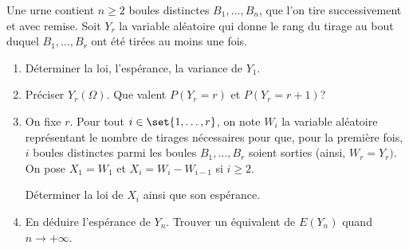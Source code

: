 \begin{enonce}
\begin{exercise}[ID={RMS127 E763},subtitle={Mines-Ponts PSI 2016},tags={}, difficulty={0}]
  Une urne contient $n\geq2$ boules distinctes $B_1,\dots,B_n$, que l'on tire successivement et avec remise.
  Soit $Y_r$ la variable aléatoire qui donne le rang du tirage au bout duquel $B_1,\dots,B_r$ ont été tirées au moins une fois.
  \begin{enumerate}
    \item Déterminer la loi, l'espérance, la variance de $Y_1$.

    \item Préciser $Y_r(\Omega)$.
      Que valent $P\left( Y_r = r \right)$ et $P\left( Y_r = r+1 \right)$?

    \item On fixe $r$.
      Pour tout $i\in\set{1,\dots,r}$, on note $W_i$ la variable aléatoire représentant le nombre de tirages nécessaires pour que, pour la première fois, $i$ boules distinctes parmi les boules $B_1,\dots,B_r$ soient sorties (ainsi, $W_r=Y_r)$.
      On pose $X_1=W_1$ et $X_i=W_i - W_{i-1}$ si $i\geq 2$.

      Déterminer la loi de $X_i$ ainsi que son espérance.

    \item En déduire l'espérance de $Y_n$.
      Trouver un équivalent de $E\left( Y_n \right)$ quand $n\to+\infty$.
  \end{enumerate}
\end{exercise}
\begin{solution}
\end{solution}
\end{enonce}

